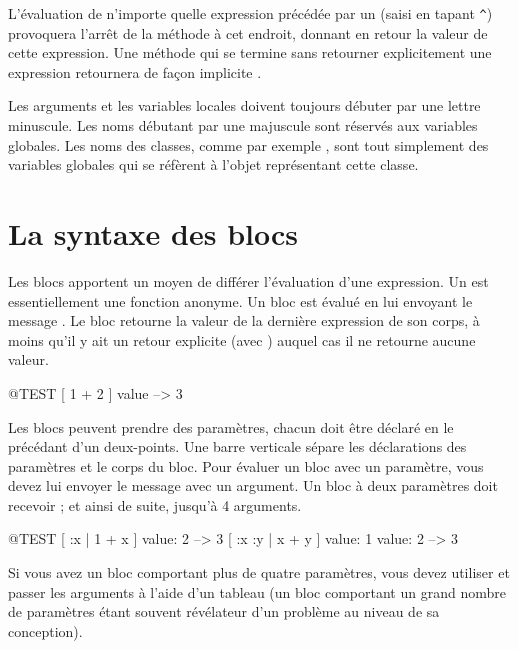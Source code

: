 \documentclass[a4paper,10pt,twoside]{book}
\begin{document}
L'évaluation de n'importe quelle expression précédée
par un \ct{^} (saisi en tapant \verb|^|) provoquera l'arrêt de la méthode à cet endroit, 
donnant en retour la valeur de cette expression.
Une méthode qui se termine sans retourner explicitement une expression retournera de façon implicite .


Les arguments et les variables locales doivent toujours débuter par une lettre minuscule.
Les noms débutant par une majuscule sont réservés aux variables globales.
Les noms des classes, comme par exemple , sont tout
simplement des variables globales qui se réfèrent à l'objet représentant cette classe.

\section{La syntaxe des blocs}

Les blocs apportent un moyen de différer l'évaluation d'une expression.
Un  est essentiellement une fonction anonyme. Un bloc est évalué 
en lui envoyant le message .
Le bloc retourne la valeur de la dernière expression de son corps,
à moins qu'il y ait un retour explicite (avec \ct{^}) auquel cas il ne retourne aucune valeur.

\begin{code}{@TEST}
[ 1 + 2 ] value --> 3
\end{code}

Les blocs peuvent prendre des paramètres, chacun doit être
déclaré en le précédant d'un deux-points.
Une barre verticale sépare les déclarations des paramètres
et le corps du bloc.
Pour évaluer un bloc avec un paramètre, vous devez lui envoyer le message 
  avec un argument.
Un bloc à deux paramètres doit recevoir  ; et 
ainsi de suite, jusqu'à 4 arguments.

\begin{code}{@TEST}
[ :x | 1 + x ] value: 2 --> 3
[ :x :y | x + y ] value: 1 value: 2 --> 3
\end{code}

Si vous avez un bloc comportant plus de quatre paramètres, vous devez utiliser
 et passer les arguments à
l'aide d'un tableau (un bloc comportant un grand nombre de paramètres étant 
souvent révélateur d'un problème au niveau de sa conception).
\end{document}
